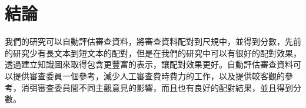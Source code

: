 
\chapter{結論}

我們的研究可以自動評估審查資料，將審查資料配對到尺規中，並得到分數，先前的研究少有長文本到短文本的配對，但是在我們的研究中可以有很好的配對效果，透過建立知識圖來取得包含更豐富的表示，讓配對效果更好。自動評估審查資料可以提供審查委員一個參考，減少人工審查費時費力的工作，以及提供較客觀的參考，消弭審查委員間不同主觀意見的影響，而且也有良好的配對結果，並且得到分數。

